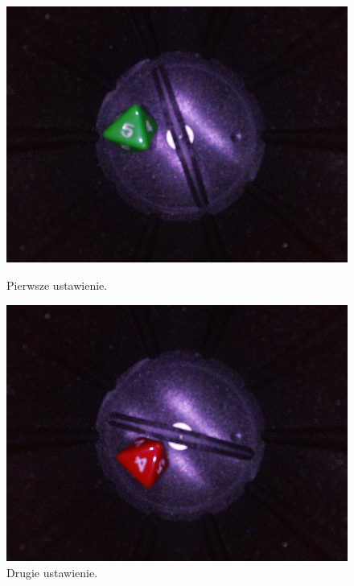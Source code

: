 \begin{figure}[H]
    \centering
    \begin{minipage}{0.32\textwidth}
        \centering
        \includegraphics[width=\linewidth]{chapters/03-praca-wlasna/figures/kolorki/zielona.jpg}
        \caption{\label{fig:zielona}Pierwsze ustawienie.}
    \end{minipage}
    \hfill
    \begin{minipage}{0.32\textwidth}
        \centering
        \includegraphics[width=\linewidth]{chapters/03-praca-wlasna/figures/kolorki/czerwona.jpg}
        \caption{\label{fig:czerwona}Drugie ustawienie.}
    \end{minipage}

\end{figure}

